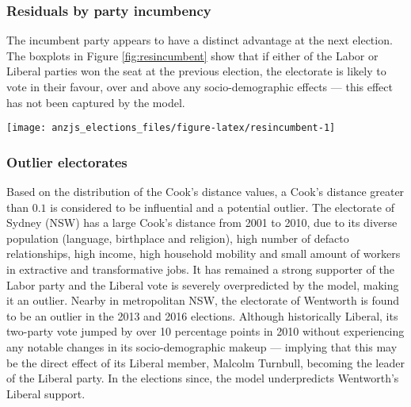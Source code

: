 \documentclass[times, doublespace]{anzsauth}
\let\origfigure\figure
\let\endorigfigure\endfigure
\renewenvironment{figure}[1][2] {
    \expandafter\origfigure\expandafter[htbp]
} {
    \endorigfigure
}
\begin{document}
\hypertarget{residuals-by-party-incumbency}{%
\subsubsection*{Residuals by party incumbency}\label{residuals-by-party-incumbency}}

The incumbent party appears to have a distinct advantage at the next election. The boxplots in Figure \ref{fig:resincumbent} show that if either of the Labor or Liberal parties won the seat at the previous election, the electorate is likely to vote in their favour, over and above any socio-demographic effects --- this effect has not been captured by the model.

\begin{figure}[h]

{\centering \texttt{[image: anzjs\_elections\_files/figure-latex/resincumbent-1]} 

}

\caption{Boxplot of residuals for incumbent and non-incumbent parties each year. An incumbent advantage is evident and has not been captured by the model.}\label{fig:resincumbent}
\end{figure}

\hypertarget{outlier-electorates}{%
\subsubsection*{Outlier electorates}\label{outlier-electorates}}

Based on the distribution of the Cook's distance values, a Cook's distance greater than \(0.1\) is considered to be influential and a potential outlier. The electorate of Sydney (NSW) has a large Cook's distance from 2001 to 2010, due to its diverse population (language, birthplace and religion), high number of defacto relationships, high income, high household mobility and small amount of workers in extractive and transformative jobs. It has remained a strong supporter of the Labor party and the Liberal vote is severely overpredicted by the model, making it an outlier. Nearby in metropolitan NSW, the electorate of Wentworth is found to be an outlier in the 2013 and 2016 elections. Although historically Liberal, its two-party vote jumped by over 10 percentage points in 2010 without experiencing any notable changes in its socio-demographic makeup --- implying that this may be the direct effect of its Liberal member, Malcolm Turnbull, becoming the leader of the Liberal party. In the elections since, the model underpredicts Wentworth's Liberal support.
\end{document}
